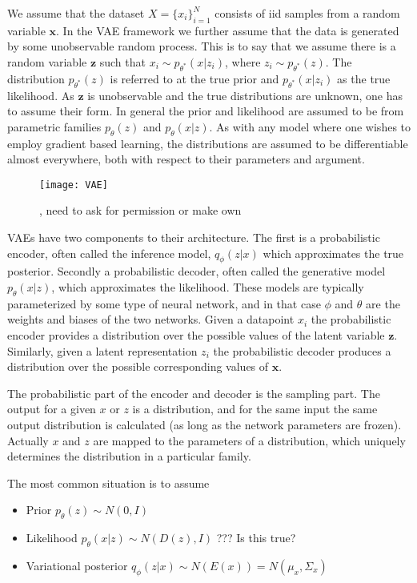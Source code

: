 \documentclass[../../thesis.tex]{subfiles}
\begin{document}
We assume that the dataset $X = \{x_i\}_{i=1}^{N}$ consists of iid samples from a random variable $\mathbf{x}$. In the VAE framework we further assume that the data is generated by some unobservable random process. This is to say that we assume there is a random variable $\mathbf{z}$ such that $x_i \sim p_{\theta^*}(x|z_i)$, where $z_i \sim p_{\theta^*}(z)$. The distribution $p_{\theta^*}(z)$ is referred to at the true prior and $p_{\theta^*}(x|z_i)$ as the true likelihood. As $\mathbf{z}$ is unobservable and the true distributions are unknown, one has to assume their form. In general the prior and likelihood are assumed to be from parametric families $p_{\theta}(z)$ and $p_{\theta}(x|z)$. As with any model where one wishes to employ gradient based learning, the distributions are assumed to be differentiable almost everywhere, both with respect to their parameters and argument.\newline
\begin{figure}[h]
    \texttt{[image: VAE]}
    \centering  
    \caption{\cite{VAE}, need to ask for permission or make own}  
\end{figure}

VAEs have two components to their architecture. The first is a probabilistic encoder, often called the inference model, $q_\phi(z|x)$ which approximates the true posterior. Secondly a probabilistic decoder, often called the generative model $p_\theta(x|z)$, which approximates the likelihood. These models are typically parameterized by some type of neural network, and in that case $\phi$ and $\theta$ are the weights and biases of the two networks. Given a datapoint $x_i$ the probabilistic encoder provides a distribution over the possible values of the latent variable $\mathbf{z}$. Similarly, given a latent representation $z_i$ the probabilistic decoder produces a distribution over the possible corresponding values of $\mathbf{x}$. \newline

The probabilistic part of the encoder and decoder is the sampling part. The output for a given $x$ or $z$ is a distribution, and for the same input the same output distribution is calculated (as long as the network parameters are frozen). Actually $x$ and $z$ are mapped to the parameters of a distribution, which uniquely determines the distribution in a particular family.\newline

The most common situation is to assume 
\begin{itemize}
    \item Prior $p_\theta(z)\sim N(0,I)$
    \item Likelihood $p_\theta(x|z)\sim N(D(z), I)$ ??? Is this true? 
    \item Variational posterior $q_\phi(z|x)\sim N(E(x)) = N(\mu_x, \Sigma_x)$
\end{itemize}
\end{document}
